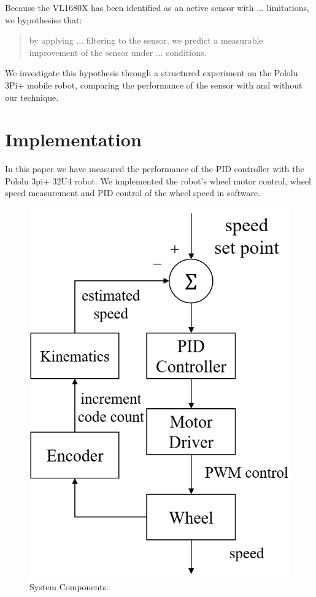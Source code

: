 \documentclass[conference]{IEEEtran}
\begin{document}
Because the VL1680X has been identified as an active sensor with ... limitations, we hypothesise that:
\begin{quote}
    by applying ... filtering to the sensor, we predict a measurable improvement of the sensor under ... conditions.  
\end{quote}

We investigate this hypothesis through a structured experiment on the Pololu 3Pi+ mobile robot, comparing the performance of the sensor with and without our technique.  

\section{Implementation}
In this paper we have measured the performance of the PID controller with the Pololu 3pi+ 32U4 robot. We implemented the robot's wheel motor control, wheel speed measurement and PID control of the wheel speed in software.

\begin{figure}[htbp]
\centerline{\includegraphics[width=0.6\linewidth]{Report/Pic/ImplementFLowChart.png}}
\caption{System Components.}
\label{fig_ImplementFlowChart}
\end{figure}
\end{document}
